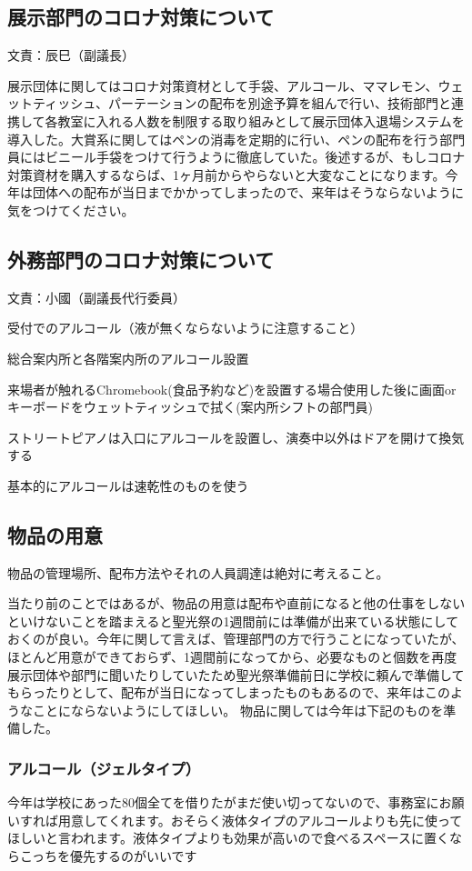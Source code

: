 \documentclass[dvipdfmx,jb5]{jarticle}
\begin{document}
\subsection{展示部門のコロナ対策について} 文責：辰巳（副議長） \vspace{2mm}

展示団体に関してはコロナ対策資材として手袋、アルコール、ママレモン、ウェットティッシュ、パーテーションの配布を別途予算を組んで行い、技術部門と連携して各教室に入れる人数を制限する取り組みとして展示団体入退場システムを導入した。大賞系に関してはペンの消毒を定期的に行い、ペンの配布を行う部門員にはビニール手袋をつけて行うように徹底していた。後述するが、もしコロナ対策資材を購入するならば、1ヶ月前からやらないと大変なことになります。今年は団体への配布が当日までかかってしまったので、来年はそうならないように気をつけてください。

\subsection{外務部門のコロナ対策について} 文責：小國（副議長代行委員） \vspace{2mm}

受付でのアルコール（液が無くならないように注意すること）

総合案内所と各階案内所のアルコール設置

来場者が触れるChromebook(食品予約など)を設置する場合使用した後に画面orキーボードをウェットティッシュで拭く(案内所シフトの部門員)

ストリートピアノは入口にアルコールを設置し、演奏中以外はドアを開けて換気する

基本的にアルコールは速乾性のものを使う

\subsection{物品の用意}
物品の管理場所、配布方法やそれの人員調達は絶対に考えること。

当たり前のことではあるが、物品の用意は配布や直前になると他の仕事をしないといけないことを踏まえると聖光祭の1週間前には準備が出来ている状態にしておくのが良い。今年に関して言えば、管理部門の方で行うことになっていたが、ほとんど用意ができておらず、1週間前になってから、必要なものと個数を再度展示団体や部門に聞いたりしていたため聖光祭準備前日に学校に頼んで準備してもらったりとして、配布が当日になってしまったものもあるので、来年はこのようなことにならないようにしてほしい。
物品に関しては今年は下記のものを準備した。
\subsubsection{アルコール（ジェルタイプ）}今年は学校にあった80個全てを借りたがまだ使い切ってないので、事務室にお願いすれば用意してくれます。おそらく液体タイプのアルコールよりも先に使ってほしいと言われます。液体タイプよりも効果が高いので食べるスペースに置くならこっちを優先するのがいいです
\end{document}
